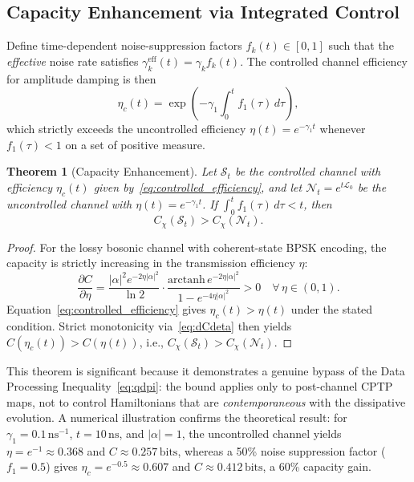 \documentclass[journal,twocolumn]{IEEEtran}
\theoremstyle{definition}
\theoremstyle{plain}
\newtheorem{theorem}{Theorem}[section]
\begin{document}
\subsection{Capacity Enhancement via Integrated Control}

Define time-dependent noise-suppression factors $f_k(t) \in [0,1]$
such that the \emph{effective} noise rate satisfies
$\gamma_k^{\mathrm{eff}}(t) = \gamma_k f_k(t)$.  The controlled
channel efficiency for amplitude damping is then
\begin{equation}
  \eta_c(t) = \exp\!\left(-\gamma_1 \int_0^t f_1(\tau)\,d\tau\right),
  \label{eq:controlled_efficiency}
\end{equation}
which strictly exceeds the uncontrolled efficiency
$\eta(t) = e^{-\gamma_1 t}$ whenever $f_1(\tau) < 1$ on a set of
positive measure.

\begin{theorem}[Capacity Enhancement]
\label{thm:capacity_enhancement}
Let $\mathcal{S}_t$ be the controlled channel with efficiency
$\eta_c(t)$ given by~\eqref{eq:controlled_efficiency}, and let
$\mathcal{N}_t = e^{t\mathcal{L}_0}$ be the uncontrolled channel
with $\eta(t) = e^{-\gamma_1 t}$.  If $\int_0^t f_1(\tau)\,d\tau < t$,
then
\begin{equation}
  C_\chi(\mathcal{S}_t) > C_\chi(\mathcal{N}_t).
  \label{eq:cap_enhancement}
\end{equation}
\end{theorem}

\begin{proof}
For the lossy bosonic channel with coherent-state BPSK encoding,
the capacity is strictly increasing in the transmission efficiency
$\eta$:
\begin{equation}
  \frac{\partial C}{\partial\eta} =
  \frac{|\alpha|^2 e^{-2\eta|\alpha|^2}}{\ln 2} \cdot
  \frac{\mathrm{arctanh}\, e^{-2\eta|\alpha|^2}}
       {1 - e^{-4\eta|\alpha|^2}} > 0
  \quad \forall\, \eta \in (0,1).
  \label{eq:dCdeta}
\end{equation}
Equation~\eqref{eq:controlled_efficiency} gives $\eta_c(t) > \eta(t)$
under the stated condition.  Strict monotonicity
via~\eqref{eq:dCdeta} then yields
$C(\eta_c(t)) > C(\eta(t))$, i.e., $C_\chi(\mathcal{S}_t) >
C_\chi(\mathcal{N}_t)$.
\end{proof}

This theorem is significant because it demonstrates a genuine
bypass of the Data Processing Inequality~\eqref{eq:qdpi}: the
bound applies only to post-channel CPTP maps, not to control
Hamiltonians that are \emph{contemporaneous} with the dissipative
evolution.  A numerical illustration confirms the theoretical
result: for $\gamma_1 = 0.1\,\mathrm{ns}^{-1}$, $t =
10\,\mathrm{ns}$, and $|\alpha|=1$, the uncontrolled channel yields
$\eta = e^{-1} \approx 0.368$ and $C \approx 0.257\,\mathrm{bits}$,
whereas a 50\% noise suppression factor ($f_1 = 0.5$) gives
$\eta_c = e^{-0.5} \approx 0.607$ and $C \approx 0.412\,\mathrm{bits}$,
a 60\% capacity gain.
\end{document}
